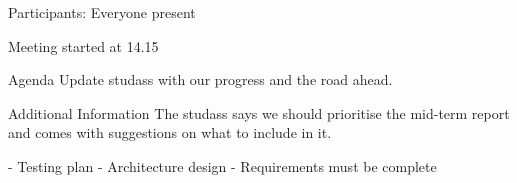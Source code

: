 Participants: Everyone present

Meeting started at 14.15

Agenda
Update studass with our progress and the road ahead.

Additional Information
The studass says we should prioritise the mid-term report and comes with suggestions on what to include in it. 

- Testing plan
- Architecture design
- Requirements must be complete